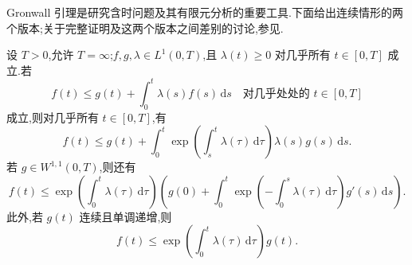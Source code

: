 \begin{note}[Gronwall 引理]\label{note:appendix-a-52}
Gronwall 引理是研究含时问题及其有限元分析的重要工具.下面给出连续情形的两个版本;关于完整证明及这两个版本之间差别的讨论,参见\textcite{Emmrich1999}.
\end{note}

\begin{lemma}\label{lem:appendix-a-53}\label{thm:appendix-a-33}
设 $T>0$,允许 $T=\infty$;$f,g,\lambda\in L^1(0,T)$,且 $\lambda(t)\ge0$ 对几乎所有 $t\in[0,T]$ 成立.若
\begin{equation}\label{eq:appendix-a-32}
 f(t)\le g(t)+\int_0^t\lambda(s)f(s)\,\mathrm ds
 \quad\text{对几乎处处的 }t\in[0,T]
\end{equation}
成立,则对几乎所有 $t\in[0,T]$,有
\begin{equation}\label{eq:appendix-a-33}
 f(t)\le g(t)+\int_0^t\exp\left(\int_s^t\lambda(\tau)\,\mathrm d\tau\right)
 \lambda(s)g(s)\,\mathrm ds.
\end{equation}
若 $g\in W^{1,1}(0,T)$,则还有
\[
 f(t)\le \exp\left(\int_0^t\lambda(\tau)\,\mathrm d\tau\right)
 \left(g(0)+\int_0^t\exp\left(-\int_0^s\lambda(\tau)\,\mathrm d\tau\right)g'(s)\,\mathrm ds\right).
\]
此外,若 $g(t)$ 连续且单调递增,则
\begin{equation}\label{eq:appendix-a-34}
 f(t)\le \exp\left(\int_0^t\lambda(\tau)\,\mathrm d\tau\right)g(t).
\end{equation}
\end{lemma}
